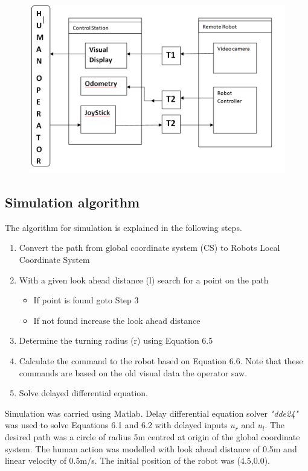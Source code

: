 \begin{figure}
	\includegraphics[width=\linewidth,keepaspectratio]{Chapter6/fig/BlockTimeDelay}
	\label{fig:teleloop} 
\end{figure}


\subsection{Simulation algorithm} 
The algorithm for simulation is explained in the following steps.
\begin{enumerate}
\item Convert the path from global coordinate system (CS) to Robots Local Coordinate System
\item With a given look ahead distance (l) search for a point on the path
\begin{itemize}
\item If point is found goto Step 3
\item If not found increase the look ahead distance 
\end{itemize}
\item Determine the turning radius (r) using Equation 6.5
\item Calculate the command to the robot based on Equation 6.6. Note that these commands are based on the old visual data the operator saw.
\item Solve delayed  differential equation.
\end{enumerate}

Simulation was carried using Matlab. Delay differential equation solver \textit{"dde24"} was used to solve Equations 6.1 and 6.2 with delayed inputs $u_r$ and $u_l$.  The desired path  was a circle of radius 5m centred at origin of the global coordinate system. The human action was modelled with look ahead distance of 0.5m and linear velocity of 0.5m/s. The initial position of the robot was (4.5,0.0).


